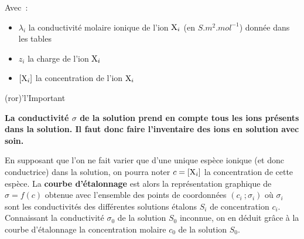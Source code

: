 \documentclass[../main/main.tex]{subfiles}
\begin{document}
{\begin{tcb}
	Avec~:
	\begin{itemize}
		\item $\lambda_i$ la conductivité molaire ionique de l'ion ${\rm X}_i$ (en
		      $\si{S.m^2.mol^{-1}}$) donnée dans les tables
		\item $z_i$ la charge de l'ion ${\rm X}_i$
		\item $[{\rm X}_i]$ la concentration de l'ion ${\rm X}_i$
	\end{itemize}
\end{tcb}

\begin{tcb}(ror)'l'{Important}
	\begin{center}
		\bfseries
		La conductivité $\sigma$ de la solution prend en compte tous les ions
		présents dans la solution. Il faut donc faire l'inventaire des ions en
		solution avec soin.
	\end{center}
\end{tcb}

En supposant que l'on ne fait varier que d'une unique espèce ionique (et donc
conductrice) dans la solution, on pourra noter $c = [{\rm X}_i]$ la
concentration de cette espèce. La \textbf{courbe d'étalonnage} est alors la
représentation graphique de $\sigma = f(c)$ obtenue avec l'ensemble des points
de coordonnées $(c_i~; \sigma_i)$ où $\sigma_i$ sont les conductivités des
différentes solutions étalons $S_i$ de concentration $c_i$. Connaissant la
conductivité $\sigma_0$ de la solution $S_0$ inconnue, on en déduit grâce à la
courbe d'étalonnage la concentration molaire $c_0$ de la solution $S_0$.
}

\setcounter{section}{2}
\end{document}
